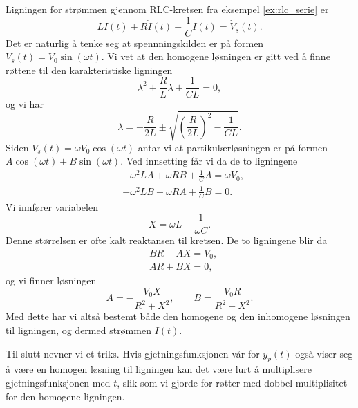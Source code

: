 \documentclass{article}
\theoremstyle{definition}
\newenvironment{ex}
{\pushQED{\qed}\renewcommand{\qedsymbol}{$\triangle$}\exx}
{\popQED\endexx}
\theoremstyle{remark}
\begin{document}
\begin{multicols*}{2}
\begin{ex}
  Ligningen for strømmen gjennom RLC-kretsen fra eksempel \ref{ex:rlc_serie} er
  \begin{equation*}
    L \ddot{I}(t) + R \dot{I}(t) + \frac{1}{C} I(t) = \dot{V}_s(t).
  \end{equation*}
  Det er naturlig å tenke seg at spennningskilden er på formen $V_s(t) = V_0 \sin(\omega t)$. Vi vet at den homogene løsningen er gitt ved å finne røttene til den karakteristiske ligningen
  \begin{equation*}
    \lambda^2 + \frac{R}{L} \lambda + \frac{1}{CL} = 0,
  \end{equation*}
  og vi har 
  \begin{equation*}
    \lambda = -\frac{R}{2L} \pm \sqrt{\left(\frac{R}{2L}\right)^2 - \frac{1}{CL}}.  
  \end{equation*}
  Siden $\dot{V}_s(t) = \omega V_0 \cos(\omega t)$ antar vi at partikulærløsningen er på formen $A \cos(\omega t) + B\sin(\omega t)$. Ved innsetting får vi da de to ligningene
  \begin{equation*}
    \begin{split}
      & - \omega^2 L A + \omega R B + \frac{1}{C} A = \omega V_0, \\
      & - \omega^2 L B - \omega R A + \frac{1}{C} B = 0.
    \end{split}
  \end{equation*}
  Vi innfører variabelen
  \begin{equation*}
    X = \omega L - \frac{1}{\omega C}.
  \end{equation*}
  Denne størrelsen er ofte kalt reaktansen til kretsen. De to ligningene blir da
  \begin{equation*}
    \begin{split}
      & BR - AX = V_0, \\
      & AR + BX = 0,
    \end{split}
  \end{equation*}
  og vi finner løsningen
  \begin{equation*}
    A = -\frac{V_0 X}{R^2 + X^2}, \qquad B = \frac{V_0 R}{R^2 + X^2}.
  \end{equation*}
  Med dette har vi altså bestemt både den homogene og den inhomogene løsningen til ligningen, og dermed strømmen $I(t)$.
\end{ex}

Til slutt nevner vi et triks. Hvis gjetningsfunksjonen vår for $y_p(t)$ også viser seg å være en homogen løsning til ligningen kan det være lurt å multiplisere gjetningsfunksjonen med $t$, slik som vi gjorde for røtter med dobbel multiplisitet for den homogene ligningen.


\end{multicols*}
\end{document}
